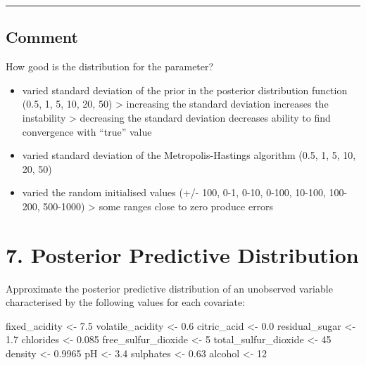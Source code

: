 \documentclass[
]{article}
\newenvironment{Shaded}{\begin{snugshade}}{\end{snugshade}}
\newcommand{\DecValTok}[1]{\textcolor[rgb]{0.00,0.00,0.81}{#1}}
\newcommand{\FloatTok}[1]{\textcolor[rgb]{0.00,0.00,0.81}{#1}}
\newcommand{\NormalTok}[1]{#1}
\newcommand{\OtherTok}[1]{\textcolor[rgb]{0.56,0.35,0.01}{#1}}
\providecommand{\tightlist}{%
  \setlength{\itemsep}{0pt}\setlength{\parskip}{0pt}}
\begin{document}
\begin{center}\rule{0.5\linewidth}{0.5pt}\end{center}

\hypertarget{comment}{%
\subsection{Comment}\label{comment}}

How good is the distribution for the parameter?

\begin{itemize}
\tightlist
\item
  varied standard deviation of the prior in the posterior distribution
  function (0.5, 1, 5, 10, 20, 50) \textgreater{} increasing the
  standard deviation increases the instability \textgreater{} decreasing
  the standard deviation decreases ability to find convergence with
  ``true'' value
\item
  varied standard deviation of the Metropolis-Hastings algorithm (0.5,
  1, 5, 10, 20, 50)
\item
  varied the random initialised values (+/- 100, 0-1, 0-10, 0-100,
  10-100, 100-200, 500-1000) \textgreater{} some ranges close to zero
  produce errors
\end{itemize}

\hypertarget{posterior-predictive-distribution}{%
\section{7. Posterior Predictive
Distribution}\label{posterior-predictive-distribution}}

Approximate the posterior predictive distribution of an unobserved
variable characterised by the following values for each covariate:

\begin{Shaded}
\begin{Highlighting}[]
\NormalTok{fixed\_acidity }\OtherTok{\textless{}{-}} \FloatTok{7.5}
\NormalTok{volatile\_acidity }\OtherTok{\textless{}{-}} \FloatTok{0.6}
\NormalTok{citric\_acid }\OtherTok{\textless{}{-}} \FloatTok{0.0}
\NormalTok{residual\_sugar }\OtherTok{\textless{}{-}} \FloatTok{1.7}
\NormalTok{chlorides }\OtherTok{\textless{}{-}} \FloatTok{0.085}
\NormalTok{free\_sulfur\_dioxide }\OtherTok{\textless{}{-}} \DecValTok{5}
\NormalTok{total\_sulfur\_dioxide }\OtherTok{\textless{}{-}} \DecValTok{45}
\NormalTok{density }\OtherTok{\textless{}{-}} \FloatTok{0.9965}
\NormalTok{pH }\OtherTok{\textless{}{-}} \FloatTok{3.4}
\NormalTok{sulphates }\OtherTok{\textless{}{-}} \FloatTok{0.63}
\NormalTok{alcohol }\OtherTok{\textless{}{-}} \DecValTok{12}
\end{Highlighting}
\end{Shaded}
\end{document}
